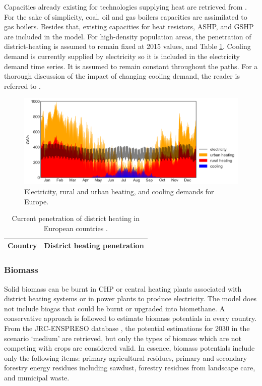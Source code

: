 \documentclass[3p]{elsarticle} %
\begin{document}
Capacities already existing for technologies supplying heat are retrieved from \cite{heating_capacities}. For the sake of simplicity, coal, oil and gas boilers capacities are assimilated to gas boilers. Besides that, existing capacities for heat resistors, ASHP, and GSHP are included in the model. For high-density population areas, the penetration of district-heating is assumed to remain fixed at 2015 values, \cite{DH_penetration} and Table \ref{tab_DH_penetration}. Cooling demand is currently supplied by electricity so it is included in the electricity demand time series. It is assumed to remain constant throughout the paths. For a thorough discussion of the impact of changing cooling demand, the reader is referred to \cite{Zhu_2020}.


\begin{figure}[!h]
	\centering
	\includegraphics[width=0.9\columnwidth]{../figures/demands.png}
	\caption{Electricity, rural and urban heating, and cooling demands for Europe.} \label{fig_demands} 
\end{figure}



\begin{table}[!h]
\footnotesize
\centering
\begin{threeparttable}
\caption{Current penetration of district heating in European countries \cite{DH_penetration}.} \label{tab_DH_penetration}
\centering
\begin{tabularx}{5.5cm}{lc}
\toprule
Country & District heating penetration  \\
\midrule

\bottomrule
\end{tabularx}
\end{threeparttable}
\end{table}


\subsubsection{Biomass}
Solid biomass can be burnt in CHP or central heating plants associated with district heating systems or in power plants to produce electricity. The model does not include biogas that could be burnt or upgraded into biomethane. A conservative approach is followed to estimate biomass potentials in every country. From the JRC-ENSPRESO database \cite{JRC_biomass, ENSPRESO}, the potential estimations for 2030 in the scenario `medium' are retrieved, but only the types of biomass which are not competing with crops are considered valid. In essence, biomass potentials include only the following items: primary agricultural residues, primary and secondary forestry energy residues including sawdust, forestry residues from landscape care, and municipal waste.
\end{document}
